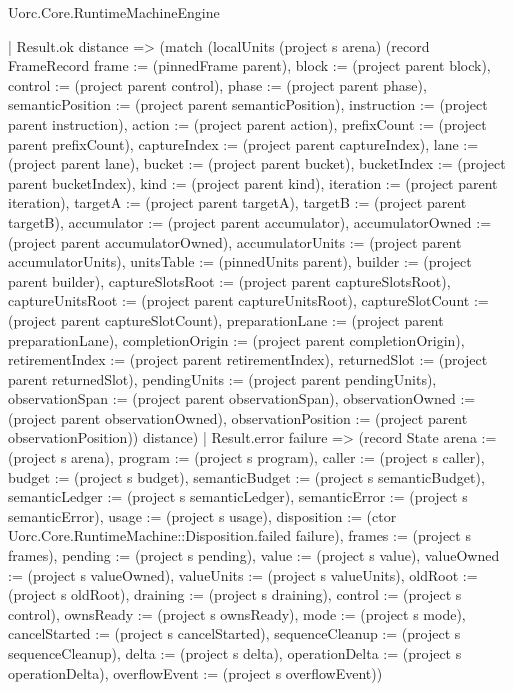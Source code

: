 \begin{lexlean}{Uorc.Core.RuntimeMachineEngine}
\begin{semanticmodule}
{              | Result.ok distance => (match (localUnits (project s arena) (record FrameRecord {frame := (pinnedFrame parent), block := (project parent block), control := (project parent control), phase := (project parent phase), semanticPosition := (project parent semanticPosition), instruction := (project parent instruction), action := (project parent action), prefixCount := (project parent prefixCount), captureIndex := (project parent captureIndex), lane := (project parent lane), bucket := (project parent bucket), bucketIndex := (project parent bucketIndex), kind := (project parent kind), iteration := (project parent iteration), targetA := (project parent targetA), targetB := (project parent targetB), accumulator := (project parent accumulator), accumulatorOwned := (project parent accumulatorOwned), accumulatorUnits := (project parent accumulatorUnits), unitsTable := (pinnedUnits parent), builder := (project parent builder), captureSlotsRoot := (project parent captureSlotsRoot), captureUnitsRoot := (project parent captureUnitsRoot), captureSlotCount := (project parent captureSlotCount), preparationLane := (project parent preparationLane), completionOrigin := (project parent completionOrigin), retirementIndex := (project parent retirementIndex), returnedSlot := (project parent returnedSlot), pendingUnits := (project parent pendingUnits), observationSpan := (project parent observationSpan), observationOwned := (project parent observationOwned), observationPosition := (project parent observationPosition)}) distance)
                | Result.error failure => (record State {arena := (project s arena), program := (project s program), caller := (project s caller), budget := (project s budget), semanticBudget := (project s semanticBudget), semanticLedger := (project s semanticLedger), semanticError := (project s semanticError), usage := (project s usage), disposition := (ctor Uorc.Core.RuntimeMachine::Disposition.failed failure), frames := (project s frames), pending := (project s pending), value := (project s value), valueOwned := (project s valueOwned), valueUnits := (project s valueUnits), oldRoot := (project s oldRoot), draining := (project s draining), control := (project s control), ownsReady := (project s ownsReady), mode := (project s mode), cancelStarted := (project s cancelStarted), sequenceCleanup := (project s sequenceCleanup), delta := (project s delta), operationDelta := (project s operationDelta), overflowEvent := (project s overflowEvent)})
}
\end{semanticmodule}
\end{lexlean}
